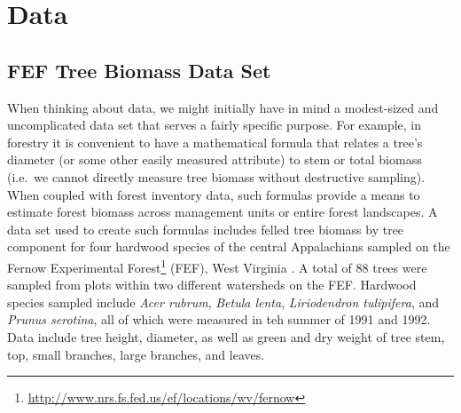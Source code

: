 \documentclass[]{krantz}
\renewcommand{\href}[2]{#2\footnote{\url{#1}}}
\theoremstyle{definition}
\theoremstyle{definition}
\theoremstyle{definition}
\theoremstyle{remark}
\begin{document}
\chapter{Data}\label{data}

\section{FEF Tree Biomass Data Set}\label{fef-tree-biomass-data-set}

When thinking about data, we might initially have in mind a modest-sized
and uncomplicated data set that serves a fairly specific purpose. For
example, in forestry it is convenient to have a mathematical formula
that relates a tree's diameter (or some other easily measured attribute)
to stem or total biomass (i.e.~we cannot directly measure tree biomass
without destructive sampling). When coupled with forest inventory data,
such formulas provide a means to estimate forest biomass across
management units or entire forest landscapes. A data set used to create
such formulas includes felled tree biomass by tree component for four
hardwood species of the central Appalachians sampled on the
\href{http://www.nrs.fs.fed.us/ef/locations/wv/fernow}{Fernow
Experimental Forest} (FEF), West Virginia \citet{Wood2016}. A total of
88 trees were sampled from plots within two different watersheds on the
FEF. Hardwood species sampled include \emph{Acer rubrum}, \emph{Betula
lenta}, \emph{Liriodendron tulipifera}, and \emph{Prunus serotina}, all
of which were measured in teh summer of 1991 and 1992. Data include tree
height, diameter, as well as green and dry weight of tree stem, top,
small branches, large branches, and leaves.



\backmatter
\printindex
\end{document}
